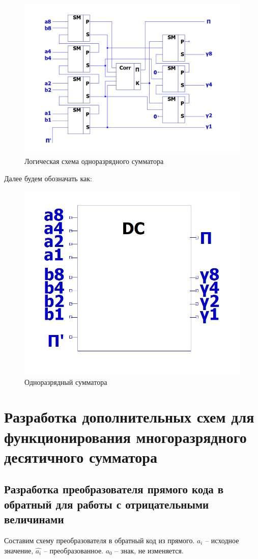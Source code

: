 \documentclass[a4paper,14pt]{article}
\begin{document}
\begin{figure}[H]
	\centering
	\includegraphics[width=\linewidth]{schemas/dc}
	\caption{Логическая схема одноразрядного сумматора}
	\label{fig:dc}
\end{figure}

Далее будем обозначать как:

\begin{figure}[H]
	\centering
	\includegraphics[width=0.3\linewidth]{schemas/dc_el}
	\caption{Одноразрядный сумматора}
	\label{fig:dcdc_el}
\end{figure}

\section{Разработка дополнительных схем для функционирования многоразрядного десятичного сумматора}

\subsection{Разработка преобразователя прямого кода в обратный для работы с отрицательными величинами}

Составим схему преобразователя в обратный код из прямого.
$a_i$ -- исходное значение, $\widehat{a_i}$ -- преобразованное. 
$a_0$ -- знак, не изменяется.
\end{document}
